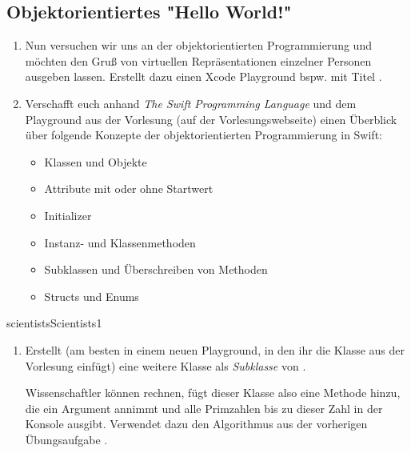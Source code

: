 \documentclass[parskip=half, final]{scrreprt}
\begin{document}
\begin{lecture} %


\section{Objektorientiertes "{}Hello World!"{}}

\begin{enumerate}

\item Nun versuchen wir uns an der objektorientierten Programmierung und möchten den  Gruß von virtuellen Repräsentationen einzelner Personen ausgeben lassen. Erstellt dazu einen Xcode Playground bspw. mit Titel .

\item Verschafft euch anhand \emph{The Swift Programming Language} und dem Playground aus der Vorlesung (auf der Vorlesungswebseite) einen Überblick über folgende Konzepte der objektorientierten Programmierung in Swift:

\begin{itemize}
	\item Klassen und Objekte
	\item Attribute mit oder ohne Startwert
	\item Initializer
	\item Instanz- und Klassenmethoden
	\item Subklassen und Überschreiben von Methoden
	\item Structs und Enums
\end{itemize}

\end{enumerate}

\begin{exc}

\begin{excitem}{scientists}{Scientists}{1}

\begin{enumerate}
\item Erstellt (am besten in einem neuen Playground, in den ihr die Klasse  aus der Vorlesung einfügt) eine weitere Klasse  als \emph{Subklasse} von .

Wissenschaftler können rechnen, fügt dieser Klasse also eine Methode  hinzu, die ein Argument  annimmt und alle Primzahlen bis zu dieser Zahl in der Konsole ausgibt. Verwendet dazu den Algorithmus aus der vorherigen Übungsaufgabe .


\end{enumerate}
\end{excitem}
\end{exc}
\end{lecture}
\end{document}
